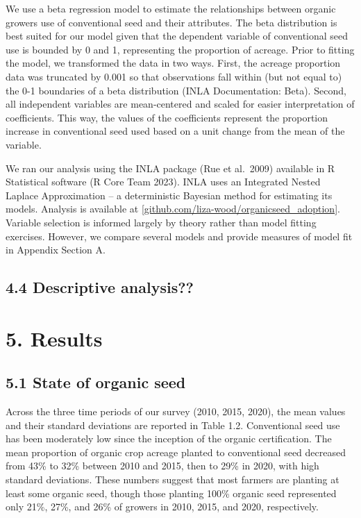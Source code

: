 \documentclass[twoside,12pt,final]{ucthesis-CA2012}
\begin{document}
\begin{ucmainmatter}
We use a beta regression model to estimate the relationships between
organic growers\textquotesingle{} use of conventional seed and their attributes. The
beta distribution is best suited for our model given that the dependent
variable of conventional seed use is bounded by 0 and 1, representing
the proportion of acreage. Prior to fitting the model, we transformed
the data in two ways. First, the acreage proportion data was truncated
by 0.001 so that observations fall within (but not equal to) the 0-1
boundaries of a beta distribution (INLA Documentation: Beta). Second,
all independent variables are mean-centered and scaled for easier
interpretation of coefficients. This way, the values of the coefficients
represent the proportion increase in conventional seed used based on a
unit change from the mean of the variable.

We ran our analysis using the INLA package (Rue et al.~2009) available
in R Statistical software (R Core Team 2023). INLA uses an Integrated
Nested Laplace Approximation -- a deterministic Bayesian method for
estimating its models. Analysis is available at
\href{https://github.com/liza-wood/organicseed_adoption}{{[}github.com/liza-wood/organicseed\_adoption{]}}.
Variable selection is informed largely by theory rather than model
fitting exercises. However, we compare several models and provide
measures of model fit in Appendix Section A.

\hypertarget{descriptive-analysis}{%
\subsection{4.4 Descriptive analysis??}\label{descriptive-analysis}}

\hypertarget{results}{%
\section{5. Results}\label{results}}

\hypertarget{state-of-organic-seed}{%
\subsection{5.1 State of organic seed}\label{state-of-organic-seed}}

Across the three time periods of our survey (2010, 2015, 2020), the mean
values and their standard deviations are reported in Table 1.2.
Conventional seed use has been moderately low since the inception of the
organic certification. The mean proportion of organic crop acreage
planted to conventional seed decreased from 43\% to 32\% between 2010 and
2015, then to 29\% in 2020, with high standard deviations. These numbers
suggest that most farmers are planting at least some organic seed,
though those planting 100\% organic seed represented only 21\%, 27\%, and
26\% of growers in 2010, 2015, and 2020, respectively.


\end{ucmainmatter}
\end{document}
